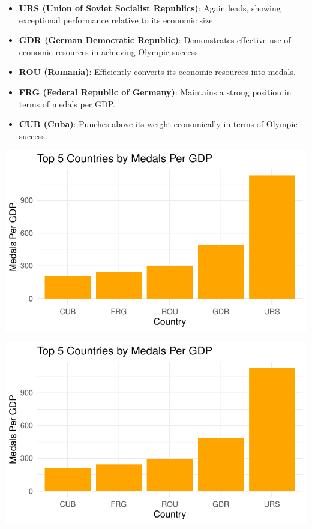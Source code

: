 \documentclass[12pt,preprint, authoryear]{elsarticle}
\let\origfigure\figure
\let\endorigfigure\endfigure
\renewenvironment{figure}[1][2] {
    \expandafter\origfigure\expandafter[H]
} {
    \endorigfigure
}
\numberwithin{equation}{section}
\numberwithin{figure}{section}
\numberwithin{table}{section}
\begin{document}
\begin{itemize}
\item
  \textbf{URS (Union of Soviet Socialist Republics)}: Again leads,
  showing exceptional performance relative to its economic size.
\item
  \textbf{GDR (German Democratic Republic)}: Demonstrates effective use
  of economic resources in achieving Olympic success.
\item
  \textbf{ROU (Romania)}: Efficiently converts its economic resources
  into medals.
\item
  \textbf{FRG (Federal Republic of Germany)}: Maintains a strong
  position in terms of medals per GDP.
\item
  \textbf{CUB (Cuba)}: Punches above its weight economically in terms of
  Olympic success.
\end{itemize}

\begin{figure}

{\centering \includegraphics{README_files/figure-latex/unnamed-chunk-3-1} 

}

\caption{The Top Countries that Dominate Winning Medals Per Capita\label{Figure3}}\label{fig:unnamed-chunk-3-1}
\end{figure}
\begin{figure}

{\centering \includegraphics{README_files/figure-latex/unnamed-chunk-3-2} 

}

\caption{The Top Countries that Dominate Winning Medals Per Capita\label{Figure3}}\label{fig:unnamed-chunk-3-2}
\end{figure}
\end{document}
